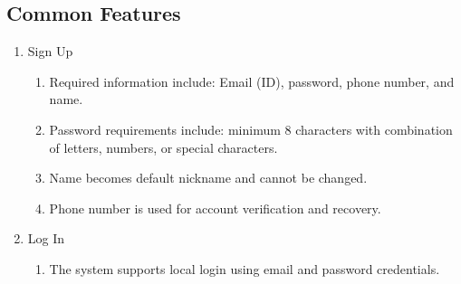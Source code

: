 \documentclass[conference]{IEEEtran}
\begin{document}
\vspace{1em} %

\subsection{Common Features}
\vspace{0.5em}

\begin{enumerate}[label=\arabic*]
    \item Sign Up\par
    \vspace{0.3em}

    \begin{enumerate}[label=\arabic*)]
        \item Required information include: Email (ID), password, phone number, and name.

        \vspace{0.5em}

        \item Password requirements include: minimum 8 characters with combination of letters, numbers, or special characters.

        \vspace{0.5em}

        \item Name becomes default nickname and cannot be changed. 

        \vspace{0.5em}

        \item Phone number is used for account verification and recovery.
    \end{enumerate}

    \vspace{1em}

    \item Log In\par
    \vspace{0.3em}

    \begin{enumerate}[label=\arabic*)]
        \item The system supports local login using email and password credentials.

        \vspace{0.5em}


\end{enumerate}
\end{enumerate}
\end{document}
